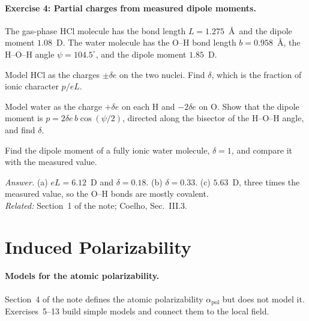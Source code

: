 \documentclass[11pt]{article}      %
\numberwithin{equation}{section}   %
\begin{document}
\paragraph{Exercise 4: Partial charges from measured dipole moments.}
The gas-phase HCl molecule has the bond length $L = 1.275$~\AA\ and the dipole moment $1.08$~D. The water molecule has the O--H bond length $b = 0.958$~\AA, the H--O--H angle $\psi = 104.5^\circ$, and the dipole moment $1.85$~D.
\begin{parts}
    \item Model HCl as the charges $\pm\delta e$ on the two nuclei. Find $\delta$, which is the fraction of ionic character $p/eL$.
    \item Model water as the charge $+\delta e$ on each H and $-2\delta e$ on O. Show that the dipole moment is $p = 2\delta e\,b\cos(\psi/2)$, directed along the bisector of the H--O--H angle, and find $\delta$.
    \item Find the dipole moment of a fully ionic water molecule, $\delta = 1$, and compare it with the measured value.
\end{parts}
\textit{Answer.} (a) $eL = 6.12$~D and $\delta = 0.18$. (b) $\delta = 0.33$. (c) $5.63$~D, three times the measured value, so the O--H bonds are mostly covalent.\\
\textit{Related:} Section~1 of the note; Coelho, Sec.~III.3.

\section{Induced Polarizability}

\paragraph{Models for the atomic polarizability.}
Section~4 of the note defines the atomic polarizability $\alpha_{\text{pol}}$ but does not model it. Exercises~5--13 build simple models and connect them to the local field.
\end{document}
